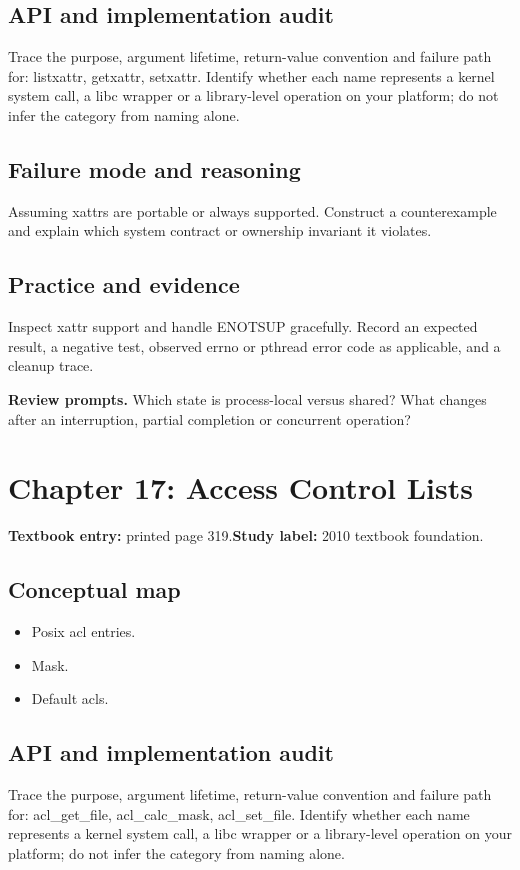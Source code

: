 \documentclass[11pt,letterpaper,oneside]{report}
\begin{document}
\subsection{API and implementation audit}
Trace the purpose, argument lifetime, return-value convention and failure path for: listxattr, getxattr, setxattr. Identify whether each name represents a kernel system call, a libc wrapper or a library-level operation on your platform; do not infer the category from naming alone.

\subsection{Failure mode and reasoning}
Assuming xattrs are portable or always supported. Construct a counterexample and explain which system contract or ownership invariant it violates.

\subsection{Practice and evidence}
Inspect xattr support and handle ENOTSUP gracefully. Record an expected result, a negative test, observed errno or pthread error code as applicable, and a cleanup trace.

\textbf{Review prompts.} Which state is process-local versus shared? What changes after an interruption, partial completion or concurrent operation?

\section{Chapter 17: Access Control Lists}
\textbf{Textbook entry:} printed page 319.\quad \textbf{Study label:} 2010 textbook foundation.

\subsection{Conceptual map}
\begin{itemize}
\item Posix acl entries.
\item Mask.
\item Default acls.
\end{itemize}
\subsection{API and implementation audit}
Trace the purpose, argument lifetime, return-value convention and failure path for: acl\_get\_file, acl\_calc\_mask, acl\_set\_file. Identify whether each name represents a kernel system call, a libc wrapper or a library-level operation on your platform; do not infer the category from naming alone.
\end{document}
